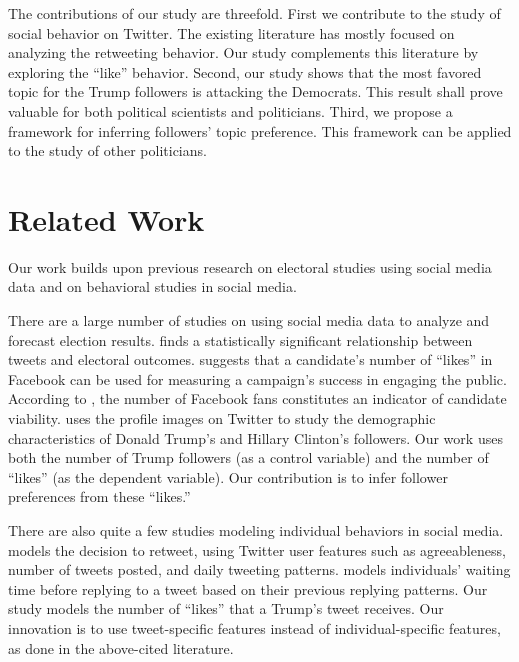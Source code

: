 \documentclass[letterpaper]{article}
\begin{document}
The contributions of our study are threefold. First we contribute to the study of social behavior on Twitter. The existing literature has mostly focused on analyzing the retweeting behavior. Our study complements this literature by exploring the ``like'' behavior. Second, our study shows that the most favored topic for the Trump followers is attacking the Democrats. This result shall prove valuable for both political scientists and politicians. Third, we propose a framework for inferring followers' topic preference. This framework can be applied to the study of other politicians.
 
\section{Related Work}

Our work builds upon previous research on electoral studies using social media data and on behavioral studies in social media.

There are a large number of studies on using social media data to analyze and forecast election results. \cite{moretweetsmorevotes} finds a statistically significant relationship between tweets and electoral outcomes. \cite{facebookCongress} suggests that a candidate's number of ``likes'' in Facebook can be used for measuring a campaign's success in engaging the public. According to \cite{fbcount}, the number of Facebook fans constitutes an indicator of candidate viability. \cite{trumpists} uses the profile images on Twitter to study the demographic characteristics of Donald Trump's and Hillary Clinton's followers. Our work uses both the number of Trump followers (as a control variable) and the number of ``likes'' (as the dependent variable). Our contribution is to infer follower preferences from these ``likes.''

%

There are also quite a few studies modeling individual behaviors in social media. \cite{retweet} models the decision to retweet, using Twitter user features such as agreeableness, number of tweets posted, and daily tweeting patterns. \cite{answer} models individuals' waiting time before replying to a tweet based on their previous replying patterns. Our study models the number of ``likes'' that a Trump's tweet receives. Our innovation is to use tweet-specific features instead of individual-specific features, as done in the above-cited literature.
\end{document}

